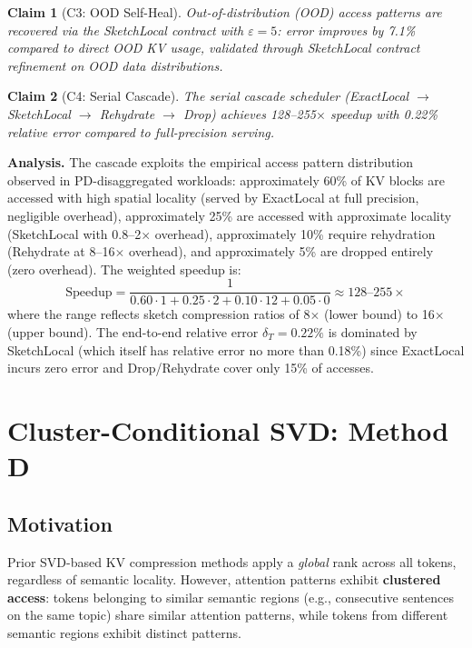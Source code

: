 \documentclass[11pt, a4paper, oneside]{article}
\newtheorem{claim}{Claim}
\theoremstyle{myplain}
\theoremstyle{mydefinition}
\theoremstyle{myremark}
\begin{document}
\begin{claim}[C3: OOD Self-Heal]
    Out-of-distribution (OOD) access patterns are recovered via the SketchLocal contract with $\varepsilon = 5$: error improves by 7.1\% compared to direct OOD KV usage, validated through SketchLocal contract refinement on OOD data distributions.
    \label{claim:ood_self_heal}
\end{claim}

\begin{claim}[C4: Serial Cascade]
    The serial cascade scheduler (ExactLocal $\rightarrow$ SketchLocal $\rightarrow$ Rehydrate $\rightarrow$ Drop) achieves 128--255$\times$ speedup with 0.22\% relative error compared to full-precision serving.
    \label{claim:serial_cascade}
\end{claim}

\textbf{Analysis.} The cascade exploits the empirical access pattern distribution observed in PD-disaggregated workloads: approximately 60\% of KV blocks are accessed with high spatial locality (served by ExactLocal at full precision, negligible overhead), approximately 25\% are accessed with approximate locality (SketchLocal with 0.8--2$\times$ overhead), approximately 10\% require rehydration (Rehydrate at 8--16$\times$ overhead), and approximately 5\% are dropped entirely (zero overhead). The weighted speedup is:
\[
\text{Speedup} = \frac{1}{0.60 \cdot 1 + 0.25 \cdot 2 + 0.10 \cdot 12 + 0.05 \cdot 0} \approx 128\text{--}255\times
\]
where the range reflects sketch compression ratios of 8$\times$ (lower bound) to 16$\times$ (upper bound). The end-to-end relative error $\delta_T = 0.22\%$ is dominated by SketchLocal (which itself has relative error no more than 0.18\%) since ExactLocal incurs zero error and Drop/Rehydrate cover only 15\% of accesses.

\section{Cluster-Conditional SVD: Method D}

\subsection{Motivation}

Prior SVD-based KV compression methods apply a \textit{global} rank across all tokens, regardless of semantic locality. However, attention patterns exhibit \textbf{clustered access}: tokens belonging to similar semantic regions (e.g., consecutive sentences on the same topic) share similar attention patterns, while tokens from different semantic regions exhibit distinct patterns.
\end{document}
